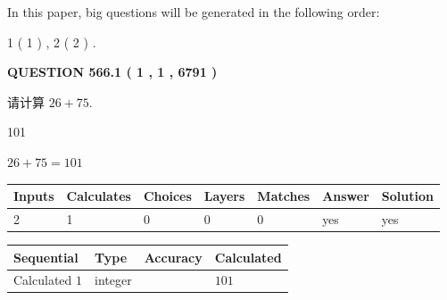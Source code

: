 \documentclass{ctexart}
\begin{document}
   
   
\vspace{0.2in}
   
In this paper, big questions will be generated in the following order: 
   
   
   1 ( 1 )
 ,
   2 ( 2 )
 .
  
\vspace{0.2in}
  
{\textbf{\Large{QUESTION
566.1 
 ( 1 , 1 , 6791 )
}}}
  
  
 
请计算 $ %
26 +  %
75 $.
 
 
 
\noindent{}
 
 

101
 
 
\noindent{}
 
 

 
 
 
\noindent{}
 
 

$ %
26 +  %
75=   %
101$
 
 
\noindent{}
 
 

 
   
   
   
   
\noindent\begin{tabular}{|l|l|l|l|l|l|l|}
 \hline
Inputs & Calculates & Choices & Layers & Matches & Answer & Solution \\ \hline
 2  & 
 1  & 
 0
  & 
 0  & 
 0  & 
  yes & 
  yes 
  \\ \hline
 \end{tabular}
   
   
   
   
\noindent{}
   
   
  
  
\noindent\begin{tabular}{|l|l|l|l|}
\hline
 Sequential & Type & Accuracy & Calculated \\ 
\hline
 
 
  Calculated $  1 $ & integer &  & 
  $ 101 $ 
 \\  \hline  
 \end{tabular}
   
\end{document}

